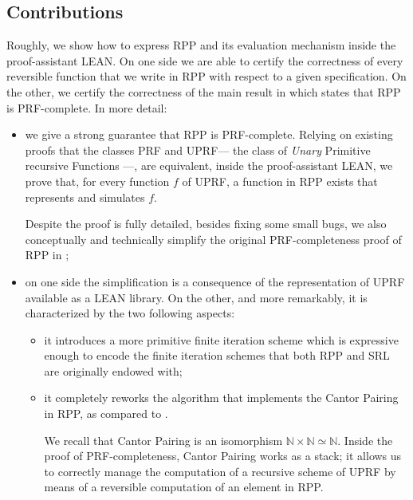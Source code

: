 \documentclass[runningheads]{llncs}
\newcommand{\RPP}{\textsf{RPP}\xspace}
\newcommand{\UPRF}{\textsf{UPRF}\xspace}
\newcommand{\PRF}{\textsf{PRF}\xspace}
\newcommand{\LEAN}{\textsf{LEAN}\xspace}
\newcommand{\SRL}{\textsf{SRL}\xspace}
\begin{document}
\subsection{Contributions}
Roughly, we show how to express \RPP and its evaluation mechanism inside the proof-assistant \LEAN \cite{Lean3}. On one side we are able to certify the correctness of every reversible function that we write in \RPP with respect to a given specification. On the other, we certify the correctness of the main result in \cite{DBLP:journals/tcs/PaoliniPR20} which states that \RPP is \PRF-complete. In more detail:
\begin{itemize}
    \item we give a strong guarantee that \RPP is \PRF-complete.
    Relying on existing proofs that the classes \PRF and \UPRF --- the class of \emph{Unary} Primitive recursive Functions ---, are equivalent, inside the proof-assistant \LEAN, we prove that, for every function $ f $ of \UPRF, a function in \RPP exists that represents and simulates $ f $.

    Despite the proof is fully detailed, besides fixing some small bugs, we also conceptually and technically simplify the original \PRF-completeness proof of \RPP in \cite{DBLP:journals/tcs/PaoliniPR20};

    \item on one side the simplification is a consequence of the representation of \UPRF available as a \LEAN library. On the other, and more remarkably, it is characterized by the two following aspects:
    \begin{itemize}
        \item it introduces a more primitive finite iteration scheme which is expressive enough to encode the finite iteration schemes that both \RPP and \SRL are originally endowed with;
        \item it completely reworks the algorithm that implements the Cantor Pairing \cite{Cantor1878,DBLP:journals/corr/Szudzik17} in \RPP, as compared to \cite{DBLP:journals/tcs/PaoliniPR20}.

        We recall that Cantor Pairing is an isomorphism $ \mathbb{N}\times\mathbb{N} \simeq \mathbb{N} $. Inside the proof of \PRF-completeness, Cantor Pairing works as a stack; it allows us to correctly manage the computation of a recursive scheme of \UPRF by means of a reversible computation of an element in \RPP.
    \end{itemize}



\end{itemize}
\end{document}
